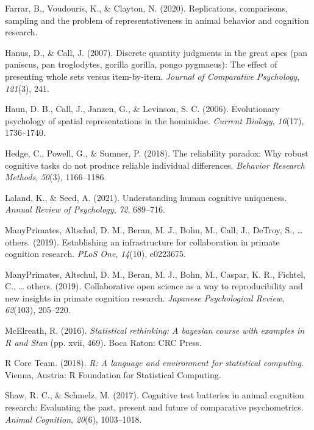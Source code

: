 \documentclass[10pt, letterpaper]{article}
\begin{document}
\leavevmode\hypertarget{ref-farrar2020replications}{}%
Farrar, B., Voudouris, K., \& Clayton, N. (2020). Replications,
comparisons, sampling and the problem of representativeness in animal
behavior and cognition research.

\leavevmode\hypertarget{ref-hanus2007discrete}{}%
Hanus, D., \& Call, J. (2007). Discrete quantity judgments in the great
apes (pan paniscus, pan troglodytes, gorilla gorilla, pongo pygmaeus):
The effect of presenting whole sets versus item-by-item. \emph{Journal
of Comparative Psychology}, \emph{121}(3), 241.

\leavevmode\hypertarget{ref-haun2006evolutionary}{}%
Haun, D. B., Call, J., Janzen, G., \& Levinson, S. C. (2006).
Evolutionary psychology of spatial representations in the hominidae.
\emph{Current Biology}, \emph{16}(17), 1736--1740.

\leavevmode\hypertarget{ref-hedge2018reliability}{}%
Hedge, C., Powell, G., \& Sumner, P. (2018). The reliability paradox:
Why robust cognitive tasks do not produce reliable individual
differences. \emph{Behavior Research Methods}, \emph{50}(3), 1166--1186.

\leavevmode\hypertarget{ref-laland2021understanding}{}%
Laland, K., \& Seed, A. (2021). Understanding human cognitive
uniqueness. \emph{Annual Review of Psychology}, \emph{72}, 689--716.

\leavevmode\hypertarget{ref-many2019establishing}{}%
ManyPrimates, Altschul, D. M., Beran, M. J., Bohn, M., Call, J., DeTroy,
S., \ldots{} others. (2019). Establishing an infrastructure for
collaboration in primate cognition research. \emph{PLoS One},
\emph{14}(10), e0223675.

\leavevmode\hypertarget{ref-primates2019collaborative}{}%
ManyPrimates, Altschul, D. M., Beran, M. J., Bohn, M., Caspar, K. R.,
Fichtel, C., \ldots{} others. (2019). Collaborative open science as a
way to reproducibility and new insights in primate cognition research.
\emph{Japanese Psychological Review}, \emph{62}(103), 205--220.

\leavevmode\hypertarget{ref-rethinking}{}%
McElreath, R. (2016). \emph{{Statistical rethinking: A bayesian course
with examples in R and Stan}} (pp. xvii, 469). Boca Raton: CRC Press.

\leavevmode\hypertarget{ref-R-base}{}%
R Core Team. (2018). \emph{R: A language and environment for statistical
computing}. Vienna, Austria: R Foundation for Statistical Computing.

\leavevmode\hypertarget{ref-shaw2017cognitive}{}%
Shaw, R. C., \& Schmelz, M. (2017). Cognitive test batteries in animal
cognition research: Evaluating the past, present and future of
comparative psychometrics. \emph{Animal Cognition}, \emph{20}(6),
1003--1018.
\end{document}
